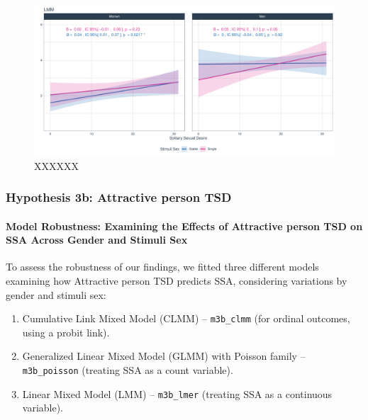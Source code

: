 \documentclass[
  bookmarksnumbered]{article}
\providecommand{\tightlist}{%
  \setlength{\itemsep}{0pt}\setlength{\parskip}{0pt}}
\begin{document}
\begin{figure}
\centering
\includegraphics{Sexual_Desire_Arousal_V2_files/figure-latex/fig-h3a-1.pdf}
\caption{\label{fig:fig-h3a}XXXXXX}
\end{figure}

\subsubsection{Hypothesis 3b: Attractive person TSD}\label{hyp3b}

\paragraph{Model Robustness: Examining the Effects of Attractive person TSD on SSA Across Gender and Stimuli Sex}\label{model-robustness-examining-the-effects-of-attractive-person-tsd-on-ssa-across-gender-and-stimuli-sex-1}

To assess the robustness of our findings, we fitted three different models examining how Attractive person TSD predicts SSA, considering variations by gender and stimuli sex:

\begin{enumerate}
\def\labelenumi{\arabic{enumi}.}
\tightlist
\item
  Cumulative Link Mixed Model (CLMM) -- \texttt{m3b\_clmm} (for ordinal outcomes, using a probit link).
\item
  Generalized Linear Mixed Model (GLMM) with Poisson family -- \texttt{m3b\_poisson} (treating SSA as a count variable).
\item
  Linear Mixed Model (LMM) -- \texttt{m3b\_lmer} (treating SSA as a continuous variable).
\end{enumerate}
\end{document}

